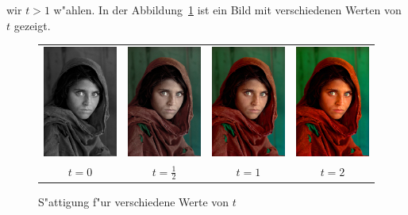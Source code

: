 wir $t>1$ w"ahlen.
In der Abbildung~\ref{color:saettigung}
ist ein Bild mit verschiedenen Werten von $t$ gezeigt.
\begin{figure}
\begin{center}
\begin{tabular}{cccc}
\includegraphics[width=0.22\hsize]{graphics/saettigung0.jpg}&%
\includegraphics[width=0.22\hsize]{graphics/saettigunghalb.jpg}&%
\includegraphics[width=0.22\hsize]{graphics/saettigung1.jpg}&%
\includegraphics[width=0.22\hsize]{graphics/saettigung2.jpg}\\
$t=0$&$t=\frac12$&$t=1$&$t=2$
\end{tabular}
\end{center}
\caption{S"attigung f"ur verschiedene Werte von $t$
\label{color:saettigung}}
\end{figure}

